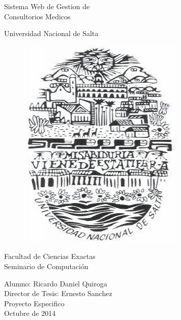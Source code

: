 
%


\begin{titlepage}


\begin{center}
    {\fontsize{45}{45} \selectfont 
    Sistema Web de Gestion de \\ Consultorios Medicos \\[2.3cm] }
\end{center}


\begin{center}
    \LARGE Universidad Nacional de Salta \\
    \begin{figure}[h]
        \begin{center}
        \includegraphics[scale=0.5]{resourse/logo-UNSa.jpg}
        \end{center}
    \end{figure}

    
    \LARGE Facultad de Ciencias Exactas \\
    Seminario de Computaci\'on \\ [2.3cm]
\end{center}


\begin{flushright}
    \Large Alumno: Ricardo Daniel Quiroga \\
    Director de Tesis: Ernesto Sanchez \\
    Proyecto Especifico \\ 
    Octubre de 2014 
    
    
\end{flushright}



\end{titlepage}


